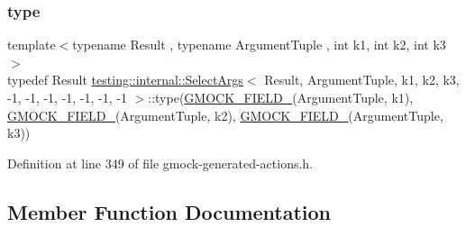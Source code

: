 \subsubsection{\texorpdfstring{type}{type}}
{\footnotesize\ttfamily template$<$typename Result , typename Argument\+Tuple , int k1, int k2, int k3$>$ \\
typedef Result \hyperlink{classtesting_1_1internal_1_1SelectArgs}{testing\+::internal\+::\+Select\+Args}$<$ Result, Argument\+Tuple, k1, k2, k3, -\/1, -\/1, -\/1, -\/1, -\/1, -\/1, -\/1 $>$\+::type(\hyperlink{gmock-generated-actions_8h_a6eb3ce92b0613603057a20ec9e593317}{G\+M\+O\+C\+K\+\_\+\+F\+I\+E\+L\+D\+\_\+}(Argument\+Tuple, k1), \hyperlink{gmock-generated-actions_8h_a6eb3ce92b0613603057a20ec9e593317}{G\+M\+O\+C\+K\+\_\+\+F\+I\+E\+L\+D\+\_\+}(Argument\+Tuple, k2), \hyperlink{gmock-generated-actions_8h_a6eb3ce92b0613603057a20ec9e593317}{G\+M\+O\+C\+K\+\_\+\+F\+I\+E\+L\+D\+\_\+}(Argument\+Tuple, k3))}



Definition at line 349 of file gmock-\/generated-\/actions.\+h.



\subsection{Member Function Documentation}
\mbox{\label{classtesting_1_1internal_1_1SelectArgs_3_01Result_00_01ArgumentTuple_00_01k1_00_01k2_00_01k3_00_4b8877f94cb457a4d2bd6b2630090309_a9f107cf68229d35e8ad5c1aa2091bde3}} 

